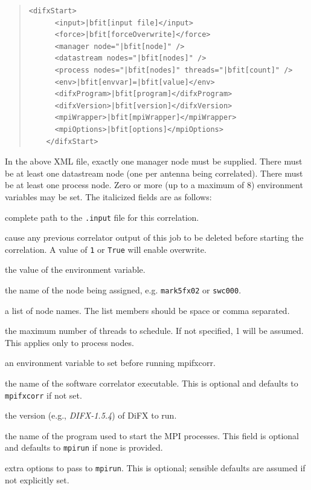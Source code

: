 \begin{description}
\begin{quotation}
\begin{Verbatim}[commandchars=\|\[\]]
    <difxStart>
      <input>|bfit[input file]</input>
      <force>|bfit[forceOverwrite]</force>
      <manager node="|bfit[node]" />
      <datastream nodes="|bfit[nodes]" />
      <process nodes="|bfit[nodes]" threads="|bfit[count]" />
      <env>|bfit[envvar]=|bfit[value]</env>
      <difxProgram>|bfit[program]</difxProgram>
      <difxVersion>|bfit[version]</difxVersion>
      <mpiWrapper>|bfit[mpiWrapper]</mpiWrapper>
      <mpiOptions>|bfit[options]</mpiOptions>
    </difxStart>
\end{Verbatim}
\end{quotation}

In the above XML file, exactly one manager node must be supplied.
There must be at least one datastream node (one per antenna being correlated).
There must be at least one process node.
Zero or more (up to a maximum of 8) environment variables may be set.
The italicized fields are as follows:

\begin{description}
\item{} complete path to the {\tt .input} file for this correlation.
\item{} cause any previous correlator output of this job to be deleted before starting the correlation.  A value of {\tt 1} or {\tt True} will enable overwrite.
\item{} the value of the environment variable.
\item{} the name of the node being assigned, e.g. {\tt mark5fx02} or {\tt swc000}.
\item{} a list of node names.  The list members should be space or comma separated.
\item{} the maximum number of threads to schedule.  If not specified, 1 will be assumed.
This applies only to process nodes.
\item{} an environment variable to set before running mpifxcorr.
\item{} the name of the software correlator executable.
This is optional and defaults to {\tt mpifxcorr} if not set.
\item{} the version (e.g., {\em DIFX-1.5.4}) of DiFX to run.
\item{} the name of the program used to start the MPI processes.
This field is optional and defaults to {\tt mpirun} if none is provided.
\item{} extra options to pass to {\tt mpirun}.
This is optional; sensible defaults are assumed if not explicitly set.
\end{description}


\end{description}
